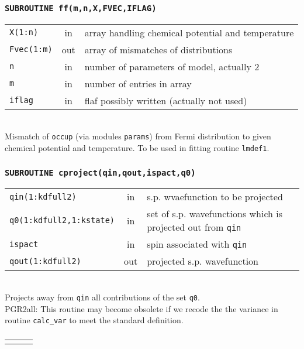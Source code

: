 \documentclass[final,1p]{elsarticle}
\newcommand{\PGRcomm}[1]{{\color{blue}\small PGR2all: #1}}
\begin{document}
\subsubsection*{\tt SUBROUTINE ff(m,n,X,FVEC,IFLAG)}
\begin{tabular}{lcl}
 {\tt X(1:n)} & in & array handling chemical potential and temperature\\
 {\tt Fvec(1:m)} & out & array of mismatches of distributions\\
 {\tt n} & in & number of parameters of model, actually 2\\
 {\tt m} & in & number of entries in array\\
 {\tt iflag} & in & flaf possibly written (actually not used)\\
\end{tabular}
\\[4pt]
Mismatch of {\tt occup} (via modules {\tt params}) from Fermi
distribution to given chemical potential and temperature. To be used
in fitting routine {\tt lmdef1}.


\subsubsection*{\tt SUBROUTINE cproject(qin,qout,ispact,q0)}
\begin{tabular}{lcl}
 {\tt qin(1:kdfull2)} & in & s.p. wvaefunction to be projected\\
 {\tt q0(1:kdfull2,1:kstate)} & in & set of s.p. wavefunctions which
 is projected out from {\tt qin}\\
 {\tt ispact} & in & spin associated with {\tt qin}\\
 {\tt qout(1:kdfull2)} & out & projected s.p. wavefunction \\
\end{tabular}
\\[4pt] Projects away from {\tt qin} all contributions of the set 
{\tt q0}.  
\\ 
\PGRcomm{This routine may become obsolete if we recode the
  the variance in routine {\tt calc\_var} to meet the
  standard definition.}



\subsubsection*{\tt }
\begin{tabular}{lcl}
 {\tt } & &\\
\end{tabular}
\\[4pt]
\end{document}
